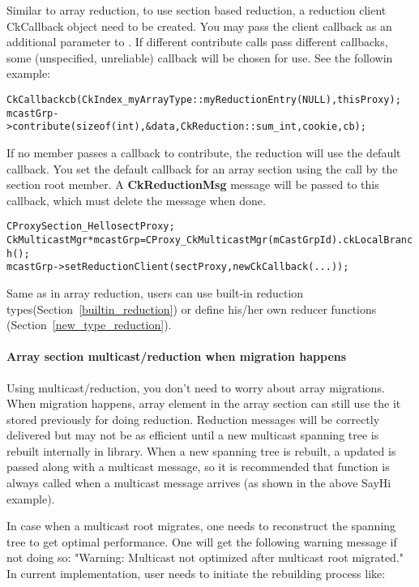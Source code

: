 Similar to array reduction, to use section based reduction, a reduction
client CkCallback object need to be created. You may pass the client callback 
as an additional parameter to . If different contribute calls 
pass different callbacks, some (unspecified, unreliable) callback will be 
chosen for use. See the followin example:

\begin{alltt}
    CkCallback cb(CkIndex_myArrayType::myReductionEntry(NULL),thisProxy); 
    mcastGrp->contribute(sizeof(int), &data, CkReduction::sum_int, cookie, cb);
\end{alltt}

If no member passes a callback to contribute, the reduction will use the 
default callback. You set the default callback for an array section using the 
 call by the section root member. A 
{\bf CkReductionMsg} message will be passed to this callback, which 
must delete the message when done.

\begin{alltt}
  CProxySection_Hello sectProxy;
  CkMulticastMgr *mcastGrp = CProxy_CkMulticastMgr(mCastGrpId).ckLocalBranch();
  mcastGrp->setReductionClient(sectProxy, new CkCallback(...));
\end{alltt}

Same as in array reduction, users can use built-in reduction 
types(Section~\ref{builtin_reduction}) or define his/her own reducer functions
(Section~\ref{new_type_reduction}).

\paragraph{Array section multicast/reduction when migration happens}

Using multicast/reduction, you don't need to worry about array migrations.
When migration happens, array element in the array section can still use 
the  it stored previously for doing reduction. 
Reduction messages will be correctly delivered but may not be as efficient 
until a new multicast spanning tree is rebuilt internally 
in  library. 
When a new spanning tree is rebuilt, a updated  is 
passed along with a multicast message, 
so it is recommended that 
 function is always called when a multicast 
message arrives (as shown in the above SayHi example).

In case when a multicast root migrates, one needs to reconstruct the 
spanning tree to get optimal performance. One will get the following
warning message if not doing so:
"Warning: Multicast not optimized after multicast root migrated."
In current implementation, user needs to initiate the rebuilding process
like:

